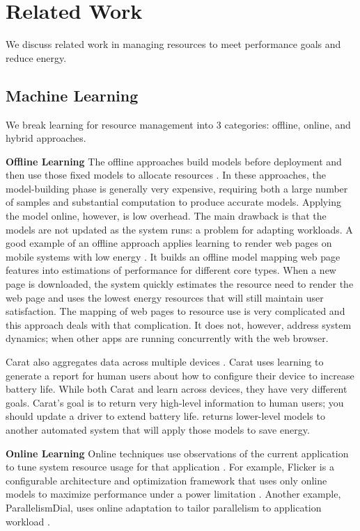 \section{Related Work}

We discuss related work in managing resources to meet performance
goals and reduce energy.  

\subsection{Machine Learning}
We break learning for resource management into 3 categories: offline,
online, and hybrid approaches.

\noindent \textbf{Offline Learning} The offline approaches build
models before deployment and then use those fixed models to allocate
resources
\cite{Yi2003,LeeBrooks2006,CPR,ChenJohn2011,petabricksStatic}.  In
these approaches, the model-building phase is generally very
expensive, requiring both a large number of samples and substantial
computation to produce accurate models.  Applying the model online,
however, is low overhead.  The main drawback is that the models are
not updated as the system runs: a problem for adapting workloads. A
good example of an offline approach applies learning to render web
pages on mobile systems with low energy \cite{reddiHPCA2013}. It
builds an offline model mapping web page features into estimations of
performance for different core types.  When a new page is downloaded,
the system quickly estimates the resource need to render the web page
and uses the lowest energy resources that will still maintain user
satisfaction.  The mapping of web pages to resource use is very
complicated and this approach deals with that complication.  It does
not, however, address system dynamics; \eg{} when other apps are
running concurrently with the web browser.

Carat also aggregates data across multiple devices \cite{carat}.
Carat uses learning to generate a report for human users about how to
configure their device to increase battery life.  While both Carat and
\SYSTEM{} learn across devices, they have very different goals.
Carat's goal is to return very high-level information to human users;
\eg{} you should update a driver to extend battery life.  \SYSTEM{}
returns lower-level models to another automated system that will apply
those models to save energy.

\noindent \textbf{Online Learning}
Online techniques use observations of the current application to tune
system resource usage for that application
\cite{Li2006,Flicker,ParallelismDial,Ponamarev,petabricksDynamic,LeeBrooks}.
For example, Flicker is a configurable architecture and optimization
framework that uses only online models to maximize performance under a
power limitation \cite{Flicker}.  Another example, ParallelismDial,
uses online adaptation to tailor parallelism to application workload
\cite{ParallelismDial}.



